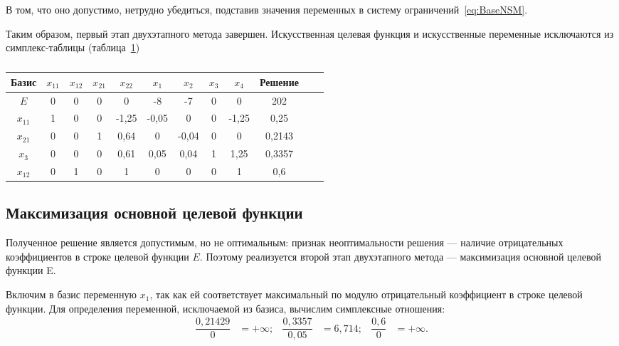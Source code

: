 В том, что оно допустимо, нетрудно убедиться, подставив значения переменных в систему
ограничений~\eqref{eq:BaseNSM}.

Таким образом, первый этап двухэтапного метода завершен. Искусственная целевая функция
и искусственные переменные исключаются из симплекс-таблицы (таблица~\ref{tbl:Simplex2_1})

\renewcommand{\tabcolsep}{0.65em}
\begin{table}[h]
  \centering
    \caption{\label{tbl:Simplex2_1}}
    \begin{tabular}{|c|c|c|c|c|c|c|c|c|c|c|c|}
      \hline
      Базис & $ x_{11} $ & $ x_{12} $ & $ x_{21} $ & $ x_{22} $ & $ x_{1} $ & $ x_{2} $ & $ x_{3} $ & $ x_{4} $ & Решение \\  
      \hline
      $ E $ & 0 & 0 & 0 & 0 & -8 & -7 & 0 & 0 & 202 \\  
      \hline
      $ x_{11} $ & 1 & 0 & 0 & -1{,}25 & -0{,}05 & 0 & 0 & -1{,}25 & 0{,}25 \\  
      \hline
      $ x_{21} $ & 0 & 0 & 1 & 0{,}64 & 0 & -0{,}04 & 0 & 0 & 0{,}2143 \\  
      \hline
      $ x_{3} $ & 0 & 0 & 0 & 0{,}61 & 0{,}05 & 0{,}04 & 1 & 1{,}25 & 0{,}3357 \\  
      \hline
      $ x_{12} $ & 0 & 1 & 0 & 1 & 0 & 0 & 0 & 1 & 0{,}6 \\  
      \hline
    \end{tabular}
\end{table}

\newpage

\subsection{Максимизация основной целевой функции}

Полученное решение является допустимым, но не оптимальным: признак
неоптимальности решения --- наличие отрицательных коэффициентов в строке
целевой функции $ E $. Поэтому реализуется второй этап двухэтапного метода ---
максимизация основной целевой функции E.

Включим в базис переменную $ x_{1} $, так как ей соответствует
максимальный по модулю отрицательный коэффициент в строке целевой
функции. Для определения переменной, исключаемой из базиса, вычислим
симплексные отношения:
\begin{align}
  \dfrac{0{,}21429}{0} & = +\infty; &
  \dfrac{0{,}3357}{0{,}05} & = 6{,}714; &
  \dfrac{0{,}6}{0} & = +\infty.
\end{align}

